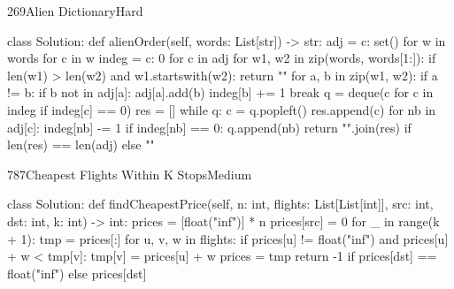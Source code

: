 \begin{problem}{269}{Alien Dictionary}{Hard}
\begin{code}
class Solution:
    def alienOrder(self, words: List[str]) -> str:
        adj = {c: set() for w in words for c in w}
        indeg = {c: 0 for c in adj}
        for w1, w2 in zip(words, words[1:]):
            if len(w1) > len(w2) and w1.startswith(w2):
                return ""
            for a, b in zip(w1, w2):
                if a != b:
                    if b not in adj[a]:
                        adj[a].add(b)
                        indeg[b] += 1
                    break
        q = deque(c for c in indeg if indeg[c] == 0)
        res = []
        while q:
            c = q.popleft()
            res.append(c)
            for nb in adj[c]:
                indeg[nb] -= 1
                if indeg[nb] == 0:
                    q.append(nb)
        return "".join(res) if len(res) == len(adj) else ""
\end{code}
\end{problem}

\begin{problem}{787}{Cheapest Flights Within K Stops}{Medium}
\begin{code}
class Solution:
    def findCheapestPrice(self, n: int, flights: List[List[int]], src: int, dst: int, k: int) -> int:
        prices = [float("inf")] * n
        prices[src] = 0
        for _ in range(k + 1):
            tmp = prices[:]
            for u, v, w in flights:
                if prices[u] != float("inf") and prices[u] + w < tmp[v]:
                    tmp[v] = prices[u] + w
            prices = tmp
        return -1 if prices[dst] == float("inf") else prices[dst]
\end{code}
\end{problem}
